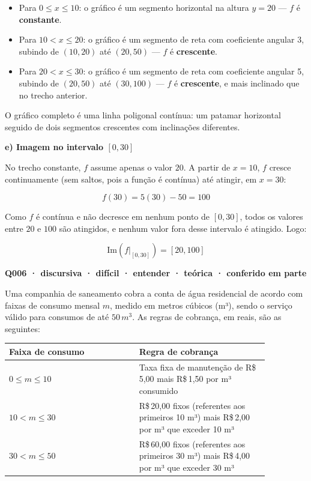 \documentclass[11pt,a4paper]{article}
\begin{document}
\begin{itemize}[nosep,leftmargin=*]
\item Para $0\le x\le 10$: o gráfico é um segmento horizontal na altura $y=20$ — $f$ é \textbf{constante}.
\item Para $10< x\le 20$: o gráfico é um segmento de reta com coeficiente angular 3, subindo de $(10,20)$ até $(20,50)$ — $f$ é \textbf{crescente}.
\item Para $20< x\le 30$: o gráfico é um segmento de reta com coeficiente angular 5, subindo de $(20,50)$ até $(30,100)$ — $f$ é \textbf{crescente}, e mais inclinado que no trecho anterior.
\end{itemize}

O gráfico completo é uma linha poligonal contínua: um patamar horizontal seguido de dois segmentos crescentes com inclinações diferentes.

\textbf{e) Imagem no intervalo $[0,30]$}

No trecho constante, $f$ assume apenas o valor $20$. A partir de $x=10$, $f$ cresce continuamente (sem saltos, pois a função é contínua) até atingir, em $x=30$:

$$f(30)=5(30)-50=100$$

Como $f$ é contínua e não decresce em nenhum ponto de $[0,30]$, todos os valores entre $20$ e $100$ são atingidos, e nenhum valor fora desse intervalo é atingido. Logo:

$$\text{Im}(f|_{[0,30]}) = [20, 100]$$

\bigskip\noindent\textbf{Q006 · discursiva · difícil · entender · teórica · conferido em parte}\par\nopagebreak
Uma companhia de saneamento cobra a conta de água residencial de acordo com faixas de consumo mensal $m$, medido em metros cúbicos (m³), sendo o serviço válido para consumos de até $50\,m^3$. As regras de cobrança, em reais, são as seguintes:

\begin{center}
\begin{tabular}{|p{0.430\linewidth}|p{0.430\linewidth}|}
\hline
\textbf{Faixa de consumo} & \textbf{Regra de cobrança} \\
\hline
$0 \le m \le 10$ & Taxa fixa de manutenção de R\$\,5,00 mais R\$\,1,50 por m³ consumido \\
\hline
$10 < m \le 30$ & R\$\,20,00 fixos (referentes aos primeiros 10 m³) mais R\$\,2,00 por m³ que exceder 10 m³ \\
\hline
$30 < m \le 50$ & R\$\,60,00 fixos (referentes aos primeiros 30 m³) mais R\$\,4,00 por m³ que exceder 30 m³ \\
\hline
\end{tabular}
\end{center}
\end{document}
